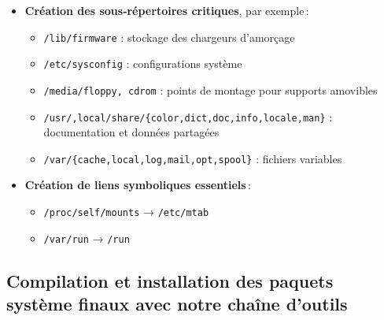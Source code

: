 \begin{itemize}
  \item \textbf{Création des sous‑répertoires critiques}, par exemple :
    \begin{itemize}
      \item \texttt{/lib/firmware}           : stockage des chargeurs d’amorçage  
      \item \texttt{/etc/sysconfig}          : configurations système  
      \item \texttt{/media/floppy, cdrom}    : points de montage pour supports amovibles  
      \item \texttt{/usr/{,local/}share/\{color,dict,doc,info,locale,man\}} : documentation et données partagées  
      \item \texttt{/var/\{cache,local,log,mail,opt,spool\}}             : fichiers variables  
    \end{itemize}

  \item \textbf{Création de liens symboliques essentiels} :
    \begin{itemize}
      \item \texttt{/proc/self/mounts} → \texttt{/etc/mtab}  
      \item \texttt{/var/run}           → \texttt{/run}  
    \end{itemize}
\end{itemize}









\subsection{Compilation et installation des paquets système finaux avec notre chaîne d’outils}
\label{sssec:install-final}

